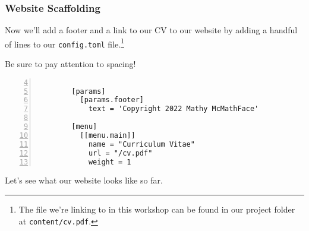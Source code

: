 \begin{frame}[fragile]
    \frametitle{Website Scaffolding}

    Now we'll add a footer and a link to our CV to our website by adding a handful of lines to our \texttt{config.toml} 
    file.\footnote{
      The file we're linking to in this workshop can be found in our project folder at \texttt{content/cv.pdf}.
    } 

    \bigskip
    
    Be sure to pay attention to spacing!

    \smallskip

    \begin{lstlisting}[style=saneCode,gobble=8,title={config.toml},numbers=left,firstnumber=4]
        
        [params]
          [params.footer]
            text = 'Copyright 2022 Mathy McMathFace'
        
        [menu]
          [[menu.main]]
            name = "Curriculum Vitae"
            url = "/cv.pdf"
            weight = 1
    \end{lstlisting}

    \vfill

    Let's see what our website looks like so far.
\end{frame}